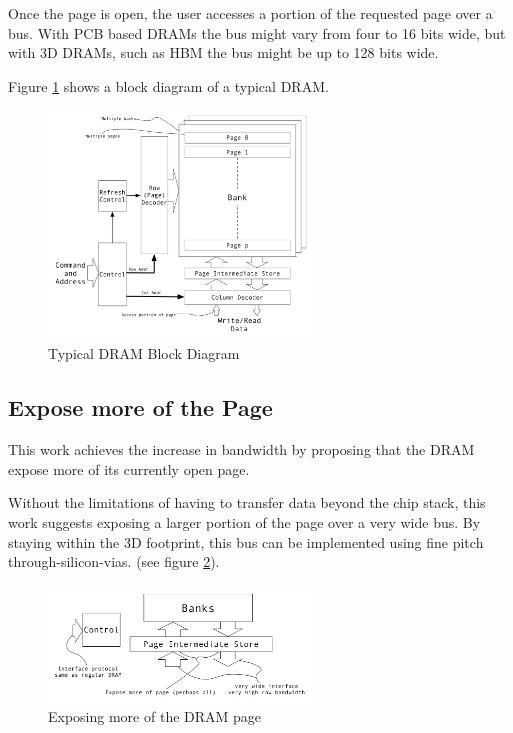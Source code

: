 \documentclass[journal]{IEEEtran}
\begin{document}
Once the page is open, the user accesses a portion of the requested page over a bus. With PCB based DRAMs the bus might vary from four to 16 bits wide, but with 3D DRAMs, such as HBM the bus might be up to 128 bits wide.

Figure \ref{fig:dramBlockDiagram} shows a block diagram of a typical DRAM.

\begin{figure}[!t]
\centering
\captionsetup{justification=centering}
\centerline{
\mbox{\includegraphics[width=2.75in]{DRAMBlockDiagram.jpg}}
}
\center\caption{Typical DRAM Block Diagram}
\label{fig:dramBlockDiagram}
\end{figure}

\subsection{Expose more of the Page}
\label{sec:exposeMorePage}

This work achieves the increase in bandwidth by proposing that the DRAM expose more of its currently open page.

Without the limitations of having to transfer data beyond the chip stack, this work suggests exposing a larger portion of the page over a very wide bus. By staying within the 3D footprint, this bus can be implemented using fine pitch through-silicon-vias.
(see figure \ref{fig:dramBusChange}).

\begin{figure}[!t]
\centering
\captionsetup{justification=centering}
\captionsetup{width=.9\linewidth}
\centerline{
\mbox{\includegraphics[width=2.75in]{DRAMBusChange.jpg}}
}
\center\caption{Exposing more of the DRAM page}
\label{fig:dramBusChange}
\end{figure}
\end{document}
